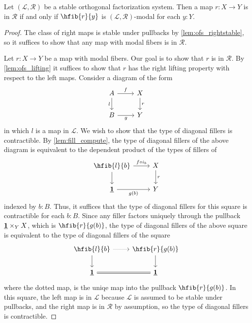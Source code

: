 \begin{lem}\label{lem:sofs_rfib}
Let $(\mathcal{L},\mathcal{R})$ be a stable orthogonal factorization system.
Then a map $r:X\to Y$ is in $\mathcal{R}$ if and only if $\hfib{r}{y}$
is $(\mathcal{L},\mathcal{R})$-modal for each $y:Y$.
\end{lem}

\begin{proof}
The class of right maps is stable under pullbacks by \autoref{lem:ofs_rightstable},
so it suffices to show that any map with modal fibers is in $\mathcal{R}$.

Let $r:X\to Y$ be a map with modal fibers. Our goal is to show that
$r$ is in $\mathcal{R}$. By \autoref{lem:ofs_lifting} it suffices to show that
$r$ has the right lifting property with respect to the left maps.
Consider a diagram of the form
\begin{equation*}
\begin{tikzcd}
A \arrow[d,swap,"l"] \arrow[r,"f"] & X \arrow[d,"r"] \\
B \arrow[r,swap,"g"] & Y
\end{tikzcd}
\end{equation*}
in which $l$ is a map in $\mathcal{L}$.
We wish to show that the type of diagonal fillers is contractible.
By \autoref{lem:fill_compute}, the type of diagonal fillers of the above diagram
is equivalent to the dependent product of the types of fillers of
\begin{equation*}
\begin{tikzcd}
\hfib{l}{b} \arrow[d] \arrow[r,"f\circ i_b"] & X \arrow[d,"r"] \\
\unit \arrow[r,swap,"g(b)"] & Y
\end{tikzcd}
\end{equation*}
indexed by $b:B$. Thus, it suffices that the type of diagonal fillers for this
square is contractible for each $b:B$. Since any filler factors uniquely through
the pullback $\underline{\mathbf{1}}\times_Y X$, which is $\hfib{r}{g(b)}$, the type of diagonal
fillers of the above square is equivalent to the type of diagonal fillers of the
square
\begin{equation*}
\begin{tikzcd}
\hfib{l}{b} \arrow[d] \arrow[r,densely dotted] & \hfib{r}{g(b)} \arrow[d] \\
\unit \arrow[r,equals] & \unit
\end{tikzcd}
\end{equation*}
where the dotted map, is the uniqe map into the pullback $\hfib{r}{g(b)}$. In
this square, the left map is in $\mathcal{L}$ because $\mathcal{L}$ is assumed
to be stable under pullbacks, and the right map is in $\mathcal{R}$ by assumption,
so the type of diagonal fillers is contractible.
\end{proof}

